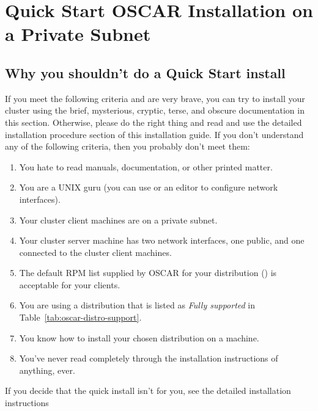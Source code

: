 %
%
%

\section{Quick Start OSCAR Installation on a Private Subnet}


\subsection{Why you shouldn't do a Quick Start install}

If you meet the following criteria and are very brave, you can try to
install your cluster using the brief, mysterious, cryptic, terse, and
obscure documentation in this section.  Otherwise, please do the right
thing and read and use the detailed installation procedure section of
this installation guide.  If you don't understand any of the following
criteria, then you probably don't meet them:

\begin{enumerate}
\item You hate to read manuals, documentation, or other printed
  matter.
\item You are a UNIX guru (you can use  or an editor to
  configure network interfaces).
\item Your cluster client machines are on a private subnet.
\item Your cluster server machine has two network interfaces, one
  public, and one connected to the cluster client machines.
\item The default RPM list supplied by OSCAR for your distribution
  ()
  is acceptable for your clients.
\item You are using a distribution that is listed as \emph{Fully
    supported} in Table~\ref{tab:oscar-distro-support}.
\item You know how to install your chosen distribution on a machine.
\item You've never read completely through the installation
  instructions of anything, ever.
\end{enumerate}

\docswitch{}{}

If you decide that the quick install isn't for you, see the detailed
installation instructions 

